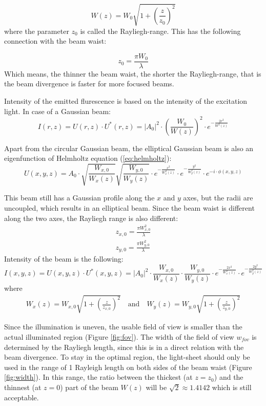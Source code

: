 \documentclass{diploma_style}
\begin{document}
\begin{equation}
	W(z) = W_0\sqrt{1+\left( \frac{z}{z_0} \right)^2}
\end{equation}
where the parameter $z_0$ is called the Rayliegh-range. This has the following connection with the beam waist:

\begin{equation}
	z_0 = \frac{\pi W_0}{\lambda}
\end{equation}
Which means, the thinner the beam waist, the shorter the Rayliegh-range, that is the beam divergence is faster for more focused beams.

Intensity of the emitted flurescence is based on the intensity of the excitation light. In case of a Gaussian beam:
\begin{equation}
	I(r,z) = U(r,z)\cdot U^*(r,z) = |A_0|^2 \cdot \left( \frac{W_0}{W(z)}\right)^2 \cdot e^{-\frac{2r^2}{W^2(z)}}
\end{equation}

Apart from the circular Gaussian beam, the elliptical Gaussian beam is also an eigenfunction of Helmholtz equation (\ref{eq:helmholtz}):
\begin{equation}
	U(x,y,z) = A_0 \cdot \sqrt{\frac{W_{x,0}}{W_x(z)}} \sqrt{\frac{W_{y,0}}{W_y(z)}} \cdot e^{-\frac{x^2}{W_x^2(z)}} \cdot e^{-\frac{y^2}{W_y^2(z)}} \cdot e^{-i\cdot \phi(x,y,z)}
\end{equation}

This beam still has a Gaussian profile along the $x$ and $y$ axes, but the radii are uncoupled, which results in an elliptical beam. Since the beam waist is different along the two axes, the Rayliegh range is also different:
\begin{align}
	z_{x,0} = \frac{\pi W_{x,0}^2}{\lambda} \\
	z_{y,0} = \frac{\pi W_{y,0}^2}{\lambda}
\end{align}
Intensity of the beam is the following:
\begin{equation}
	I(x,y,z) = U(x,y,z)\cdot U^*(x,y,z) = |A_0|^2 \cdot \frac{W_{x,0}}{W_x(z)} \cdot \frac{W_{y,0}}{W_y(z)} \cdot e^{-\frac{2x^2}{W_x^2(z)}} \cdot e^{-\frac{2y^2}{W_y^2(z)}}
\end{equation}
where
\begin{align}
W_x(z) = W_{x,0}\sqrt{1+\left( \frac{z}{z_{x,0}} \right)^2}\mathrm{\quad and \quad } W_y(z) = W_{y,0}\sqrt{1+\left( \frac{z}{z_{y,0}} \right)^2}
\end{align}

Since the illumination is uneven, the usable field of view is smaller than the actual illuminated region (Figure \ref{fig:fov}). The width of the field of view $w_{fov}$ is determined by the Rayliegh length, since this is in a direct relation with the beam divergence. To stay in the optimal region, the light-sheet should only be used in the range of 1 Rayleigh length on both sides of the beam waist (Figure \ref{fig:width}). In this range, the ratio between the thickest (at $z=z_0$) and the thinnest (at $z=0$) part of the beam $W(z)$ will be $\sqrt{2}\approx 1.4142$ which is still acceptable.
\end{document}

